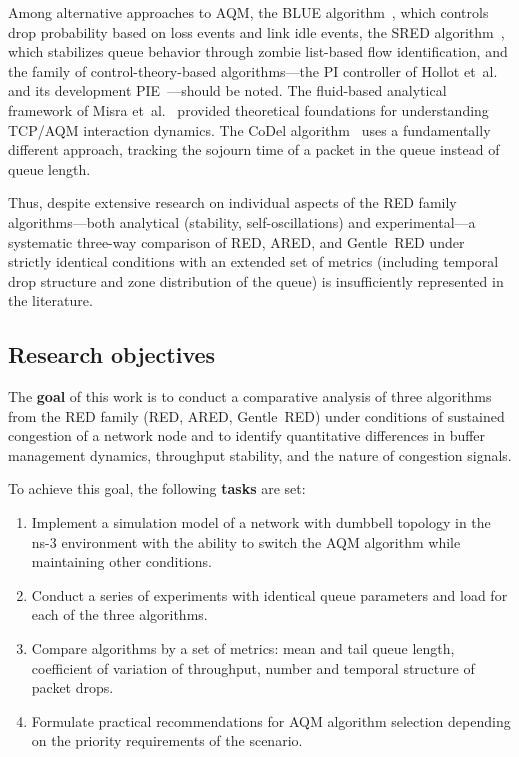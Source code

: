 \documentclass[default]{subfiles}
\begin{document}
{Among alternative approaches to AQM, the BLUE algorithm~\cite{feng2002}, which controls drop probability based on loss events and link idle events, the SRED algorithm~\cite{ott1999}, which stabilizes queue behavior through zombie list-based flow identification, and the family of control-theory-based algorithms---the PI controller of Hollot et~al.~\cite{hollot2001} and its development PIE~\cite{pan2013}---should be noted. The fluid-based analytical framework of Misra et~al.~\cite{misra2000} provided theoretical foundations for understanding TCP/AQM interaction dynamics. The CoDel algorithm~\cite{nichols2012} uses a fundamentally different approach, tracking the sojourn time of a packet in the queue instead of queue length.

Thus, despite extensive research on individual aspects of the RED family algorithms---both analytical (stability, self-oscillations) and experimental---a systematic three-way comparison of RED, ARED, and Gentle~RED under strictly identical conditions with an extended set of metrics (including temporal drop structure and zone distribution of the queue) is insufficiently represented in the literature.

\subsection{Research objectives}

The \textbf{goal} of this work is to conduct a comparative analysis of three algorithms from the RED family (RED, ARED, Gentle~RED) under conditions of sustained congestion of a network node and to identify quantitative differences in buffer management dynamics, throughput stability, and the nature of congestion signals.

To achieve this goal, the following \textbf{tasks} are set:
\begin{enumerate}
  \item Implement a simulation model of a network with dumbbell topology in the ns-3 environment with the ability to switch the AQM algorithm while maintaining other conditions.
  \item Conduct a series of experiments with identical queue parameters and load for each of the three algorithms.
  \item Compare algorithms by a set of metrics: mean and tail queue length, coefficient of variation of throughput, number and temporal structure of packet drops.
  \item Formulate practical recommendations for AQM algorithm selection depending on the priority requirements of the scenario.
\end{enumerate}

}
\end{document}
